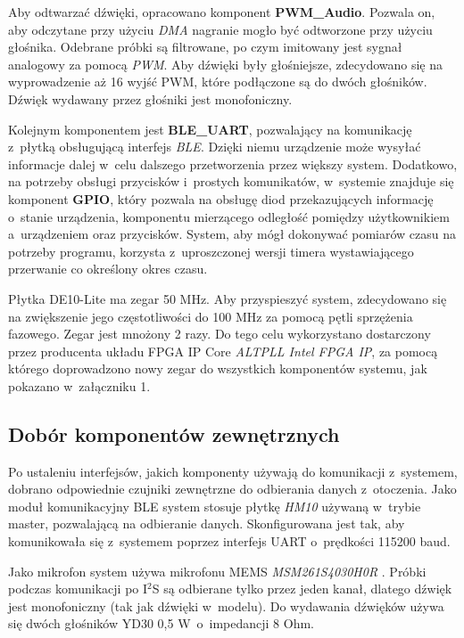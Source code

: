 Aby odtwarzać dźwięki, opracowano komponent \textbf{PWM\_Audio}. Pozwala on, aby odczytane przy użyciu \textit{DMA} nagranie mogło być odtworzone przy użyciu głośnika. Odebrane próbki są filtrowane, po czym imitowany jest sygnał analogowy za pomocą \textit{PWM}. Aby dźwięki były głośniejsze, zdecydowano się na wyprowadzenie aż 16 wyjść PWM, które podłączone są do dwóch głośników. Dźwięk wydawany przez głośniki jest monofoniczny.

Kolejnym komponentem jest \textbf{BLE\_UART}, pozwalający na komunikację z~płytką obsługującą interfejs \textit{BLE}. Dzięki niemu urządzenie może wysyłać informacje dalej w~celu dalszego przetworzenia przez większy system. Dodatkowo, na potrzeby obsługi przycisków i~prostych komunikatów, w~systemie znajduje się komponent \textbf{GPIO}, który pozwala na obsługę diod przekazujących informację o~stanie urządzenia, komponentu mierzącego odległość pomiędzy użytkownikiem a~urządzeniem oraz przycisków. System, aby mógł dokonywać pomiarów czasu na potrzeby programu, korzysta z~uproszczonej wersji timera wystawiającego przerwanie co określony okres czasu.

Płytka DE10-Lite ma zegar 50 MHz. Aby przyspieszyć system, zdecydowano się na zwiększenie jego częstotliwości do 100 MHz za pomocą pętli sprzężenia fazowego. Zegar jest mnożony 2 razy. Do tego celu wykorzystano dostarczony przez producenta układu FPGA IP Core \textit{ALTPLL Intel FPGA IP}, za pomocą którego doprowadzono nowy zegar do wszystkich komponentów systemu, jak pokazano w~załączniku 1.

\subsection{Dobór komponentów zewnętrznych}

Po ustaleniu interfejsów, jakich komponenty używają do komunikacji z~systemem, dobrano odpowiednie czujniki zewnętrzne do odbierania danych z~otoczenia. Jako moduł komunikacyjny BLE system stosuje płytkę \textit{HM10} \cite{HM10} używaną w~trybie master, pozwalającą na odbieranie danych. Skonfigurowana jest tak, aby komunikowała się z~systemem poprzez interfejs UART o~prędkości 115200 baud.

Jako mikrofon system używa mikrofonu MEMS \textit{MSM261S4030H0R} \cite{Microphone}. Próbki podczas komunikacji po I$^2$S \cite{Wiki
} są odbierane tylko przez jeden kanał, dlatego dźwięk jest monofoniczny (tak jak dźwięki w~modelu). Do wydawania dźwięków używa się dwóch głośników YD30 0,5 W~o~impedancji 8 Ohm.

